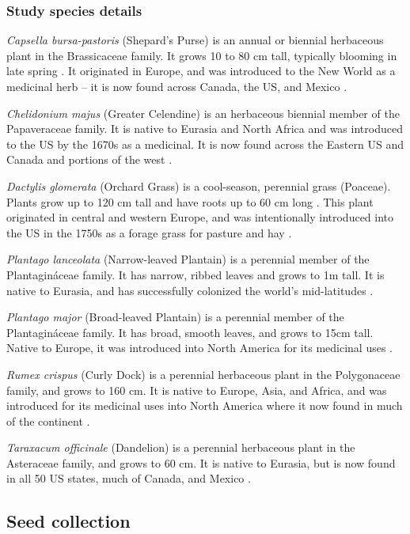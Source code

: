 \documentclass[12pt]{article}\usepackage[]{graphicx}\usepackage[]{color}
\begin{document}
	\subsubsection{Study species details}
	\textit{Capsella bursa-pastoris} (Shepard’s Purse) is an annual or biennial herbaceous plant in the Brassicaceae family. It grows 10 to 80 cm tall, typically blooming in late spring \parencite{Defelice2001}. It originated in Europe, and was introduced to the New World as a medicinal herb – it is now found across Canada, the US, and Mexico \parencite{Westrich1989}.
	
	\textit{Chelidonium majus} (Greater Celendine) is an herbaceous biennial member of the Papaveraceae family. It is native to Eurasia and North Africa and was introduced to the US by the 1670s as a medicinal. It is now found across the Eastern US and Canada and portions of the west \parencite{Holm1979}. 
	
	\textit{Dactylis glomerata} (Orchard Grass) is a cool-season, perennial grass (Poaceae). Plants grow up to 120 cm tall and have roots up to 60 cm long \parencite{Moser1996}. This plant originated in central and western Europe, and was intentionally introduced into the US in the 1750s \parencite{Bush2012} as a forage grass for pasture and hay \parencite{Ogle2011}.  
	
	\textit{Plantago lanceolata} (Narrow-leaved Plantain) is a perennial member of the Plantagináceae family. It has narrow, ribbed leaves and grows to 1m tall. It is native to Eurasia, and has successfully colonized the world’s mid-latitudes \parencite{Holm1977}.
	
	\textit{Plantago major} (Broad-leaved Plantain) is a perennial member of the Plantagináceae family. It has broad, smooth leaves, and grows to 15cm tall. Native to Europe, it was introduced into North America for its medicinal uses \parencite{Knobloch1996,Samuelsen2000}.
	
	\textit{Rumex crispus} (Curly Dock) is a perennial herbaceous plant in the Polygonaceae family, and grows to 160 cm. It is native to Europe, Asia, and Africa, and was introduced for its medicinal uses into North America where it now found in much of the continent \parencite{USDA2010}. 
	
	\textit{Taraxacum officinale} (Dandelion) is a perennial herbaceous plant in the Asteraceae family, and grows to 60 cm. It is native to Eurasia, but is now found in all 50 US states, much of Canada, and Mexico \parencite{USDA1971}.
	
	\subsection{Seed collection}
	
\end{document}
